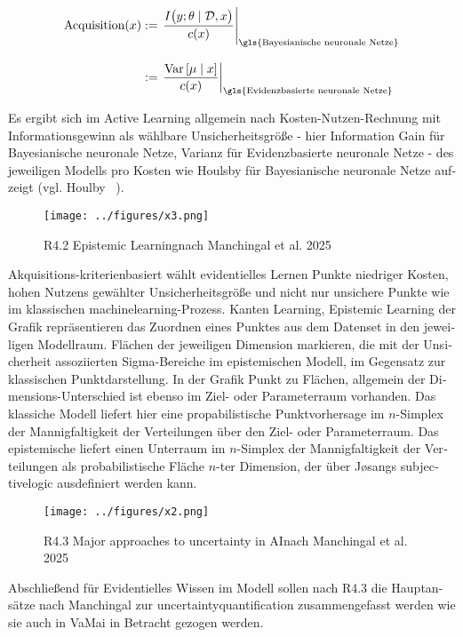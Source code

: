 \begin{otherlanguage}{ngerman}
\begin{align*}
\text{Acquisition}(x)
&:=
\left.
\frac{
I\bigl(y ; \theta \mid \mathcal{D}, x \bigr)
}{
c(x)
}
\right|_{\text{\gls{Bayesianische neuronale Netze}}}
\\[2ex]
&:=
\left.
\frac{
\mathrm{Var}\left[ \mu \mid x \right]
}{
c(x)
}
\right|_{\text{\gls{Evidenzbasierte neuronale Netze}}}
\end{align*}

Es ergibt sich im Active Learning allgemein nach Kosten-Nutzen-Rechnung mit Informationsgewinn als wählbare Unsicherheitsgröße - hier Information Gain für \gls{Bayesianische neuronale Netze}, Varianz für \gls{Evidenzbasierte neuronale Netze} - des jeweiligen Modells pro Kosten wie Houlsby für \gls{Bayesianische neuronale Netze} aufzeigt (vgl. Houlby ~\parencite[]{houlsby2011bayesian}). 

\begin{figure}[!ht]
  \centering
  \texttt{[image: ../figures/x3.png]}
  \caption{R4.2 \glqq Epistemic Learning\grqq nach Manchingal et al. 2025}
\end{figure}

Akquisitions-kriterienbasiert wählt evidentielles Lernen Punkte niedriger Kosten, hohen Nutzens gewählter Unsicherheitsgröße und nicht nur unsichere Punkte wie im klassischen \gls{machinelearning}-Prozess. Kanten \glqq Learning, Epistemic Learning \grqq der Grafik repräsentieren das Zuordnen eines Punktes aus dem Datenset in den jeweiligen Modellraum. Flächen der jeweiligen Dimension markieren, die mit der Unsicherheit assoziierten Sigma-Bereiche im epistemischen Modell, im Gegensatz zur klassischen Punktdarstellung. In der Grafik Punkt zu Flächen, allgemein der Dimensions-Unterschied ist ebenso im Ziel- oder Parameterraum vorhanden. Das klassiche Modell liefert hier eine propabilistische Punktvorhersage im $n$-Simplex der Mannigfaltigkeit der Verteilungen über den Ziel- oder Parameterraum. Das epistemische liefert einen Unterraum im $n$-Simplex der Mannigfaltigkeit der Verteilungen als probabilistische Fläche $n$-ter Dimension, der über Jøsangs \gls{subjectivelogic} ausdefiniert werden kann.

\begin{figure}[!ht]
  \centering
  \texttt{[image: ../figures/x2.png]}
  \caption{R4.3 \glqq Major approaches to uncertainty in AI\grqq nach Manchingal et al. 2025}
\end{figure}

Abschließend für Evidentielles Wissen im Modell sollen nach R4.3 die Hauptansätze nach Manchingal zur \gls{uncertaintyquantification} zusammengefasst werden wie sie auch in VaMai in Betracht gezogen werden.


\end{otherlanguage}
